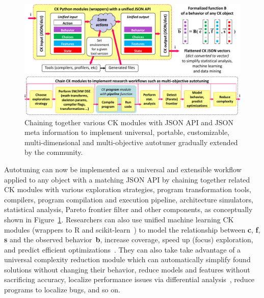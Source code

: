    \begin{figure}[!htbp]
     \centering
      \includegraphics[width=6.6in]
      {ck-assets/9a4de89400e0ff21-cropped.pdf} %
     \caption{
       Chaining together various CK modules with JSON API and JSON meta information
       to implement universal, portable, customizable, multi-dimensional
       and multi-objective autotuner gradually extended by the community.
     }
     \label{fig:ck-universal-autotuning-workflow}
   \end{figure}

Autotuning can now be implemented as a universal and extensible workflow
applied to any object with a matching JSON API by chaining together
related CK modules with various exploration strategies,
program transformation tools, compilers,
program compilation and execution pipeline, architecture simulators,
statistical analysis, Pareto frontier filter and other components,
as conceptually shown in Figure~\ref{fig:ck-universal-autotuning-workflow}.
%
Researchers can also use unified machine learning CK modules
(wrappers to R and scikit-learn~\cite{scikit-learn})
to model the relationship between \textbf{c}, \textbf{f}, \textbf{s}
and the observed behavior~\textbf{b}, increase coverage, speed up (focus) exploration,
and predict efficient optimizations~\cite{fursin:hal-01054763,cm:29db2248aba45e59:cd11e3a188574d80}.
%
They can also take take advantage of a universal complexity reduction module
which can automatically simplify found solutions without changing their behavior,
reduce models and features without sacrificing accuracy,
localize performance issues via differential analysis~\cite{FOTP04},
reduce programs to localize bugs, and so on.

